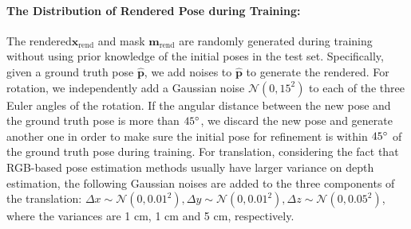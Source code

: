 \documentclass[twocolumn]{svjour3}
\newcommand{\xrend}[0]{\mathbf{x}_{\text{rend}}}
\newcommand{\mrend}[0]{\mathbf{m}_{\text{rend}}}
\newcommand{\rend}[0]{rendered}
\newcommand{\gtpose}[0]{\mathbf{\hat{p}}}
\begin{document}
\paragraph{The Distribution of Rendered Pose during Training:}
The \rend\image $\xrend$ and mask $\mrend$ are randomly generated during training without using prior knowledge of the initial poses in the test set. 
Specifically, given a ground truth pose $\gtpose$, we add noises to $\gtpose$ to generate the \rend\poses. 
For rotation, we independently add a Gaussian noise $\mathcal{N}(0, 15^2)$ to each of the three Euler angles of the rotation. If the angular distance between the new pose and the ground truth pose is more than $45\degree$, we discard the new pose and generate another one in order to make sure the initial pose for refinement is within $45\degree$ of the ground truth pose during training. 
For translation, considering the fact that RGB-based pose estimation methods usually have larger variance on depth estimation, the following Gaussian noises are added to the three components of the translation: $\Delta x \sim \mathcal{N}(0, 0.01^2), \Delta y \sim \mathcal{N}(0, 0.01^2), \Delta z \sim \mathcal{N}(0, 0.05^2)$, where the variances are 1 cm, 1 cm and 5 cm, respectively.



\begin{figure*}[t]
\hfill
{}
\hfill
{}
\caption{Synthetic Data for the LINEMOD, Occlusion dataset and YCB-Video separately. \ref{subig.data_syn_lm} shows the synthetic training data used when training on the LINEMOD dataset, only one object is presented in the image so there is no occlusion. \ref{subfig.data_syn_occ} shows the synthetic training data used when training on the Occlusion dataset, multiple objects are presented in one image so one object may be occluded by other objects. \ref{subfig.data_syn_ycb} shows the synthetic training data used when training on the YCB-Video dataset. These images are rendered on the fly, so we only render two objects to maintain efficiency.}
\label{fig.data_syn}
\vspace{-4mm}
\end{figure*}
\end{document}
